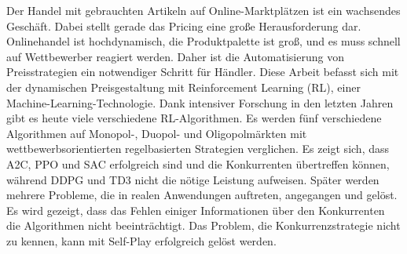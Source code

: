 Der Handel mit gebrauchten Artikeln auf Online-Marktplätzen ist ein wachsendes Geschäft.
Dabei stellt gerade das Pricing eine große Herausforderung dar.
Onlinehandel ist hochdynamisch, die Produktpalette ist groß, und es muss schnell auf Wettbewerber reagiert werden.
Daher ist die Automatisierung von Preisstrategien ein notwendiger Schritt für Händler.
Diese Arbeit befasst sich mit der dynamischen Preisgestaltung mit Reinforcement Learning (RL), einer Machine-Learning-Technologie.
Dank intensiver Forschung in den letzten Jahren gibt es heute viele verschiedene RL-Algorithmen.
Es werden fünf verschiedene Algorithmen auf Monopol-, Duopol- und Oligopolmärkten mit wettbewerbsorientierten regelbasierten Strategien verglichen.
Es zeigt sich, dass A2C, PPO und SAC erfolgreich sind und die Konkurrenten übertreffen können, während DDPG und TD3 nicht die nötige Leistung aufweisen.
Später werden mehrere Probleme, die in realen Anwendungen auftreten, angegangen und gelöst.
Es wird gezeigt, dass das Fehlen einiger Informationen über den Konkurrenten die Algorithmen nicht beeinträchtigt.
Das Problem, die Konkurrenzstrategie nicht zu kennen, kann mit Self-Play erfolgreich gelöst werden.